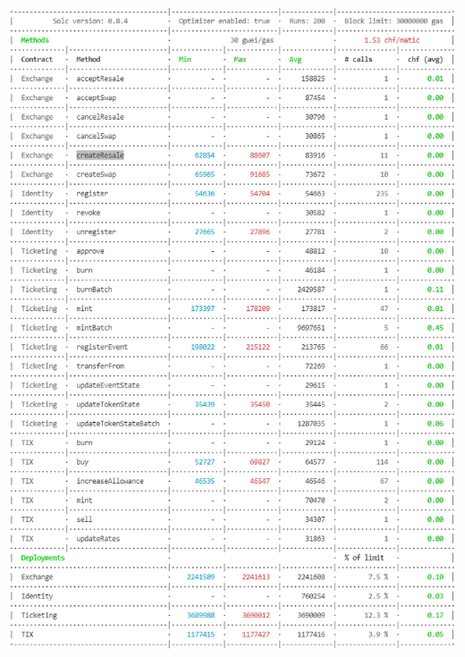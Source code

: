 \documentclass[a4paper,11pt,oneside]{report}
\begin{document}
\includegraphics[width=\textwidth]{marketplace_price_polygon_01_02_2022.PNG}
\end{document}
